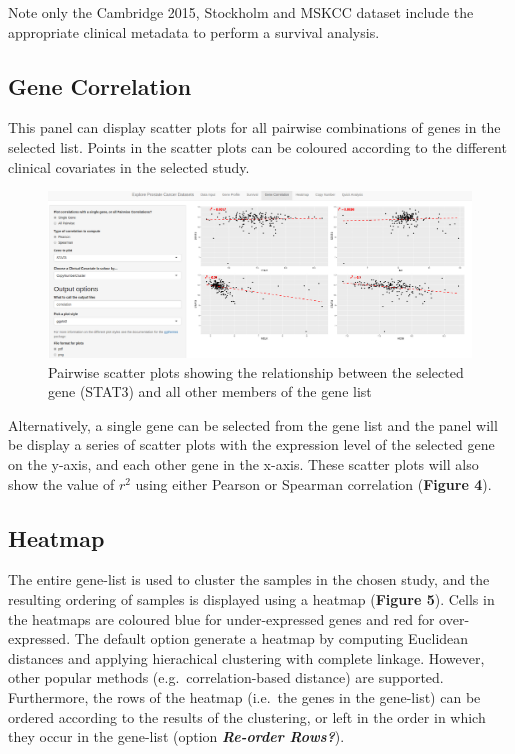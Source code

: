 \documentclass[]{article}
\begin{document}
Note only the Cambridge 2015, Stockholm and MSKCC dataset include the
appropriate clinical metadata to perform a survival analysis.

\subsection{Gene Correlation}\label{gene-correlation}

This panel can display scatter plots for all pairwise combinations of
genes in the selected list. Points in the scatter plots can be coloured
according to the different clinical covariates in the selected study.

\begin{figure}[htbp]
\centering
\includegraphics{Figure4.png}
\caption{Pairwise scatter plots showing the relationship between the
selected gene (STAT3) and all other members of the gene list}
\end{figure}

Alternatively, a single gene can be selected from the gene list and the
panel will be display a series of scatter plots with the expression
level of the selected gene on the y-axis, and each other gene in the
x-axis. These scatter plots will also show the value of \(r^2\) using
either Pearson or Spearman correlation (\textbf{Figure 4}).

\subsection{Heatmap}\label{heatmap}

The entire gene-list is used to cluster the samples in the chosen study,
and the resulting ordering of samples is displayed using a heatmap
(\textbf{Figure 5}). Cells in the heatmaps are coloured blue for
under-expressed genes and red for over-expressed. The default option
generate a heatmap by computing Euclidean distances and applying
hierachical clustering with complete linkage. However, other popular
methods (e.g.~correlation-based distance) are supported. Furthermore,
the rows of the heatmap (i.e.~the genes in the gene-list) can be ordered
according to the results of the clustering, or left in the order in
which they occur in the gene-list (option \textbf{\emph{Re-order
Rows?}}).
\end{document}

